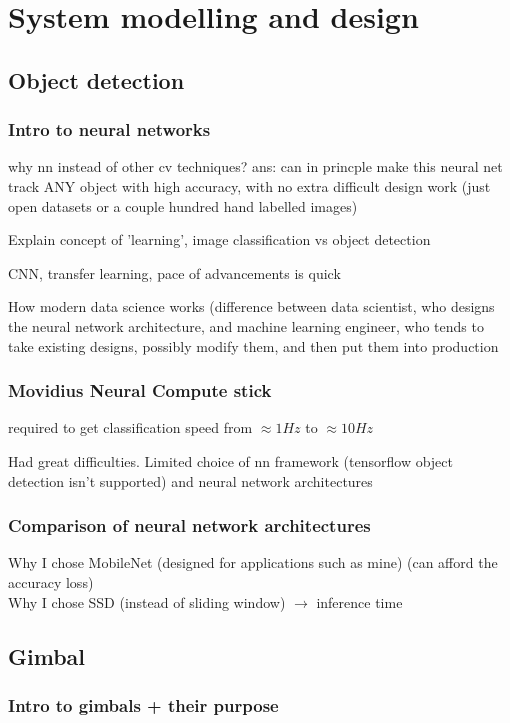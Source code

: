 \section{System modelling and design}

\subsection{Object detection}
\subsubsection{Intro to neural networks}
why nn instead of other cv techniques? ans: can in princple make this neural net track ANY object with high accuracy, with no extra difficult design work (just open datasets or a couple hundred hand labelled images)

Explain concept of 'learning', image classification vs object detection

CNN, transfer learning, pace of advancements is quick

How modern data science works (difference between data scientist, who designs the neural network architecture, and machine learning engineer, who tends to take existing designs, possibly modify them, and then put them into production

\subsubsection{Movidius Neural Compute stick}
required to get classification speed from $\approx 1 Hz$ to $\approx 10 Hz$

Had great difficulties. Limited choice of nn framework (tensorflow object detection isn't supported) and neural network architectures

\subsubsection{Comparison of neural network architectures}
Why I chose MobileNet (designed for applications such as mine) (can afford the accuracy loss)\\
Why I chose SSD (instead of sliding window) $\rightarrow$ inference time

\subsection{Gimbal}
\subsubsection{Intro to gimbals + their purpose}

